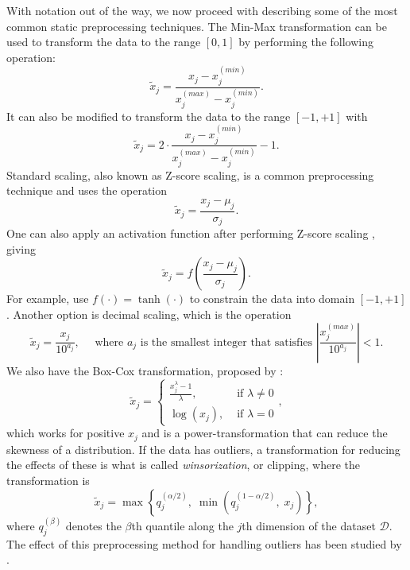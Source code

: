 \documentclass{statsmsc}
\begin{document}
{With notation out of the way, we now proceed with describing some of the most common
static preprocessing techniques.  The Min-Max transformation can be
used to transform the data to the range $[0, 1]$ by performing the following operation:
\begin{equation}\label{eq:pp1}
    \tilde{x}_j = \frac{x_j-x_j^{(min)}}{x_j^{(max)}-x_j^{(min)}} .
\end{equation}
It can also be modified to transform the data to the range $[-1,+1]$ with
\begin{equation}\label{eq:pp2}
    \tilde{x}_j = 2\cdot\frac{x_j-x_j^{(min)}}{x_j^{(max)}-x_j^{(min)}}-1.
\end{equation}
Standard scaling, also known as Z-score scaling, is a common preprocessing technique and
uses the operation
\begin{equation}\label{eq:pp3}
    \tilde{x}_j=\frac{x_j-\mu_j}{\sigma_j}.
\end{equation}
One can also apply an activation function after performing Z-score scaling \citep{nawi},
giving
\begin{equation}\label{eq:pp4}
    \tilde{x}_j=f\left(\frac{x_j-\mu_j}{\sigma_j}\right).
\end{equation}
For example, \citeauthor{mixture_ct} use $f(\cdot)=\tanh(\cdot)$ to constrain the data into domain $[-1,+1]$.
Another option is decimal scaling, which is the operation
\begin{equation}\label{eq:pp5}
    \tilde{x}_j=\frac{x_j}{10^{a_j}}, \quad \textrm{ where } a_j
    \textrm{ is the smallest integer that satisfies }
        \left|\frac{x_j^{(max)}}{10^{a_j}}  \right|<1.
\end{equation}
We also have the Box-Cox transformation, proposed by \citeauthor{boxcox}:
\begin{equation}\label{eq:pp6}
    \tilde{x}_j=\left\{
        \begin{array}{ll}
            \frac{x_j^\lambda-1}{\lambda}, & \textrm{ if } \lambda \neq 0 \\
            \log(x_j), & \textrm{ if } \lambda=0
        \end{array}
    \right.,
\end{equation}
which works for positive $x_j$ and is a power-transformation that can reduce the skewness of
a distribution.  If the data has outliers, a transformation for reducing the effects of these
is what is called \textit{winsorization}, or clipping,
where the transformation is
\begin{equation}\label{eq:pp7}
    \tilde{x}_j=\max\left\{q_j^{(\alpha/2)},\;\min\left(q_j^{(1-\alpha/2)},\; x_j\right)\right\},
\end{equation}
where $q_j^{(\beta)}$ denotes the $\beta$th quantile along the $j$th dimension of the dataset
$\mathcal{D}$. The effect of this preprocessing method for handling outliers has been
studied by \cite{winsorization}.

}
\end{document}
